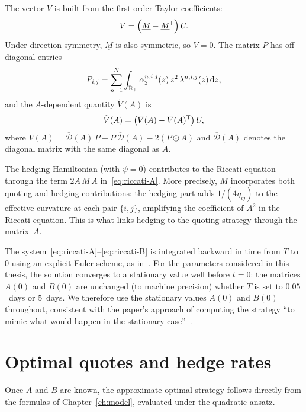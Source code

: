 The vector $V$ is built from the first-order Taylor coefficients:
\begin{equation}
  \label{eq:V-def}
  V = \left(\underline{M} - \underline{M}^{\mathsf{T}}\right) U.
\end{equation}
Under direction symmetry, $\underline{M}$ is also symmetric, so $V = 0$. The matrix $P$ has off-diagonal entries
\begin{equation}
  \label{eq:P-def}
  P_{i,j} = \sum_{n=1}^{N} \int_{\mathbb{R}_+} \alpha_2^{n,i,j}(z)\,z^2\,\lambda^{n,i,j}(z)\,\mathrm{d} z,
\end{equation}
and the $A$-dependent quantity $\tilde{V}(A)$ is
\begin{equation}
  \label{eq:Vtilde-def}
  \tilde{V}(A) = \bigl(\overline{V}(A) - \overline{V}(A)^{\mathsf{T}}\bigr)\,U,
\end{equation}
where $\overline{V}(A) = \overline{\mathcal{D}}(A)\,P + P\,\overline{\mathcal{D}}(A) - 2(P \odot A)$ and $\overline{\mathcal{D}}(A)$ denotes the diagonal matrix with the same diagonal as $A$.

The hedging Hamiltonian (with $\psi = 0$) contributes to the Riccati equation through the term $2A\,M\,A$ in~\eqref{eq:riccati-A}. More precisely, $M$ incorporates both quoting and hedging contributions: the hedging part adds $1/(4\eta_{ij})$ to the effective curvature at each pair $\{i,j\}$, amplifying the coefficient of $A^2$ in the Riccati equation. This is what links hedging to the quoting strategy through the matrix~$A$.

The system~\eqref{eq:riccati-A}--\eqref{eq:riccati-B} is integrated backward in time from $T$ to $0$ using an explicit Euler scheme, as in~\cite{barzykin2023}. For the parameters considered in this thesis, the solution converges to a stationary value well before $t = 0$: the matrices $A(0)$ and $B(0)$ are unchanged (to machine precision) whether $T$ is set to $0.05$~days or $5$~days. We therefore use the stationary values $A(0)$ and $B(0)$ throughout, consistent with the paper's approach of computing the strategy ``to mimic what would happen in the stationary case''~\cite[p.~6]{barzykin2023}.


\section{Optimal quotes and hedge rates}
\label{sec:ode-policy}

Once $A$ and $B$ are known, the approximate optimal strategy follows directly from the formulas of Chapter~\ref{ch:model}, evaluated under the quadratic ansatz.

